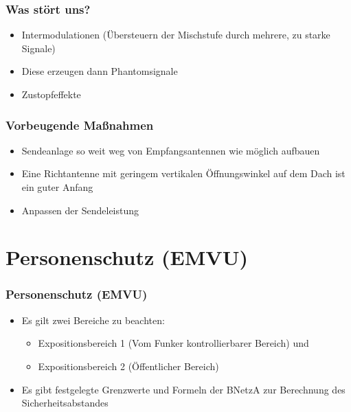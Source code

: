 \begin{frame}
	\frametitle{Was stört uns?}
	\begin{itemize}
		\item Intermodulationen (Übersteuern der Mischstufe durch mehrere, zu starke Signale)
		\item Diese erzeugen dann Phantomsignale
		\item Zustopfeffekte
	\end{itemize}
\end{frame}

\begin{frame}
	\frametitle{Vorbeugende Maßnahmen}
	\begin{itemize}
		\item Sendeanlage so weit weg von Empfangsantennen wie möglich aufbauen
		\item Eine Richtantenne mit geringem vertikalen Öffnungswinkel auf dem Dach ist ein 					guter Anfang 
		\item Anpassen der Sendeleistung
	\end{itemize}
\end{frame}

\section{Personenschutz (EMVU)}

\begin{frame}
	\frametitle{Personenschutz (EMVU)}
	\begin{itemize}
		\item Es gilt zwei Bereiche zu beachten:
			\begin{itemize}
				\item Expositionsbereich 1 (Vom Funker kontrollierbarer Bereich) und 
				\item Expositionsbereich 2 (Öffentlicher Bereich)
			\end{itemize}
		\item Es gibt festgelegte Grenzwerte und Formeln der BNetzA zur Berechnung des 						Sicherheitsabstandes
	\end{itemize}
\end{frame}

